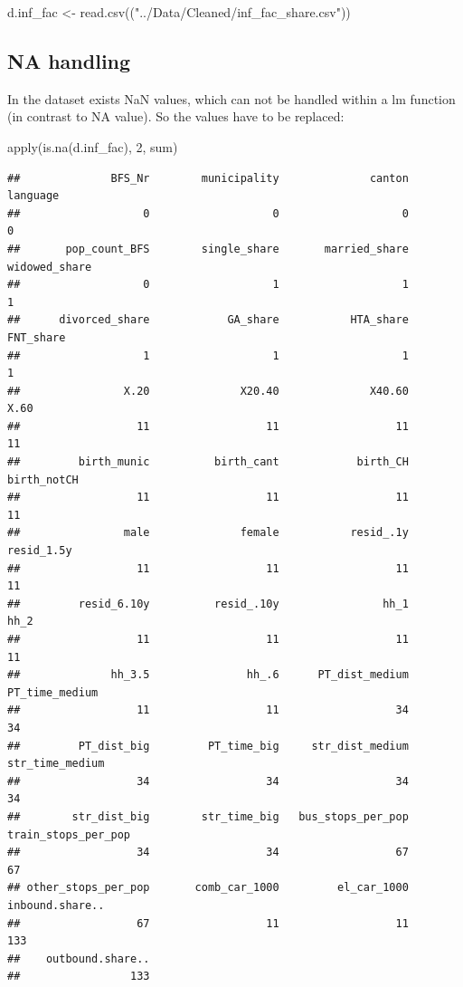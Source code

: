 \documentclass[
]{article}
\newenvironment{Shaded}{\begin{snugshade}}{\end{snugshade}}
\newcommand{\DecValTok}[1]{\textcolor[rgb]{0.00,0.00,0.81}{#1}}
\newcommand{\FunctionTok}[1]{\textcolor[rgb]{0.00,0.00,0.00}{#1}}
\newcommand{\NormalTok}[1]{#1}
\newcommand{\OtherTok}[1]{\textcolor[rgb]{0.56,0.35,0.01}{#1}}
\newcommand{\StringTok}[1]{\textcolor[rgb]{0.31,0.60,0.02}{#1}}
\begin{document}
\begin{Shaded}
\begin{Highlighting}[]
\NormalTok{d.inf\_fac }\OtherTok{\textless{}{-}} \FunctionTok{read.csv}\NormalTok{((}\StringTok{"../Data/Cleaned/inf\_fac\_share.csv"}\NormalTok{))}
\end{Highlighting}
\end{Shaded}

\hypertarget{na-handling}{%
\subsection{NA handling}\label{na-handling}}

In the dataset exists NaN values, which can not be handled within a lm
function (in contrast to NA value). So the values have to be replaced:

\begin{Shaded}
\begin{Highlighting}[]
\FunctionTok{apply}\NormalTok{(}\FunctionTok{is.na}\NormalTok{(d.inf\_fac), }\DecValTok{2}\NormalTok{, sum)}
\end{Highlighting}
\end{Shaded}

\begin{verbatim}
##              BFS_Nr        municipality              canton            language 
##                   0                   0                   0                   0 
##       pop_count_BFS        single_share       married_share       widowed_share 
##                   0                   1                   1                   1 
##      divorced_share            GA_share           HTA_share           FNT_share 
##                   1                   1                   1                   1 
##                X.20              X20.40              X40.60                X.60 
##                  11                  11                  11                  11 
##         birth_munic          birth_cant            birth_CH         birth_notCH 
##                  11                  11                  11                  11 
##                male              female           resid_.1y          resid_1.5y 
##                  11                  11                  11                  11 
##         resid_6.10y          resid_.10y                hh_1                hh_2 
##                  11                  11                  11                  11 
##              hh_3.5               hh_.6      PT_dist_medium      PT_time_medium 
##                  11                  11                  34                  34 
##         PT_dist_big         PT_time_big     str_dist_medium     str_time_medium 
##                  34                  34                  34                  34 
##        str_dist_big        str_time_big   bus_stops_per_pop train_stops_per_pop 
##                  34                  34                  67                  67 
## other_stops_per_pop       comb_car_1000         el_car_1000     inbound.share.. 
##                  67                  11                  11                 133 
##    outbound.share.. 
##                 133
\end{verbatim}
\end{document}
